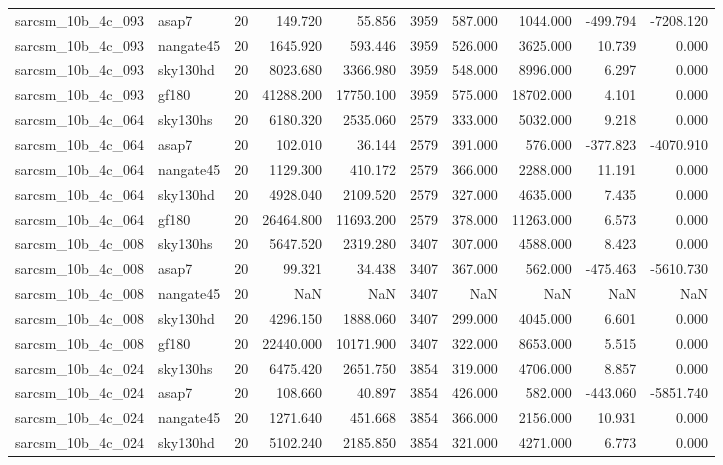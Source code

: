 \documentclass{article}
\begin{document}
\begin{longtable}{llrrrrrrrr}
sarcsm\_10b\_4c\_093 & asap7 & 20 & 149.720 & 55.856 & 3959 & 587.000 & 1044.000 & -499.794 & -7208.120 \\
sarcsm\_10b\_4c\_093 & nangate45 & 20 & 1645.920 & 593.446 & 3959 & 526.000 & 3625.000 & 10.739 & 0.000 \\
sarcsm\_10b\_4c\_093 & sky130hd & 20 & 8023.680 & 3366.980 & 3959 & 548.000 & 8996.000 & 6.297 & 0.000 \\
sarcsm\_10b\_4c\_093 & gf180 & 20 & 41288.200 & 17750.100 & 3959 & 575.000 & 18702.000 & 4.101 & 0.000 \\
sarcsm\_10b\_4c\_064 & sky130hs & 20 & 6180.320 & 2535.060 & 2579 & 333.000 & 5032.000 & 9.218 & 0.000 \\
sarcsm\_10b\_4c\_064 & asap7 & 20 & 102.010 & 36.144 & 2579 & 391.000 & 576.000 & -377.823 & -4070.910 \\
sarcsm\_10b\_4c\_064 & nangate45 & 20 & 1129.300 & 410.172 & 2579 & 366.000 & 2288.000 & 11.191 & 0.000 \\
sarcsm\_10b\_4c\_064 & sky130hd & 20 & 4928.040 & 2109.520 & 2579 & 327.000 & 4635.000 & 7.435 & 0.000 \\
sarcsm\_10b\_4c\_064 & gf180 & 20 & 26464.800 & 11693.200 & 2579 & 378.000 & 11263.000 & 6.573 & 0.000 \\
sarcsm\_10b\_4c\_008 & sky130hs & 20 & 5647.520 & 2319.280 & 3407 & 307.000 & 4588.000 & 8.423 & 0.000 \\
sarcsm\_10b\_4c\_008 & asap7 & 20 & 99.321 & 34.438 & 3407 & 367.000 & 562.000 & -475.463 & -5610.730 \\
sarcsm\_10b\_4c\_008 & nangate45 & 20 & NaN & NaN & 3407 & NaN & NaN & NaN & NaN \\
sarcsm\_10b\_4c\_008 & sky130hd & 20 & 4296.150 & 1888.060 & 3407 & 299.000 & 4045.000 & 6.601 & 0.000 \\
sarcsm\_10b\_4c\_008 & gf180 & 20 & 22440.000 & 10171.900 & 3407 & 322.000 & 8653.000 & 5.515 & 0.000 \\
sarcsm\_10b\_4c\_024 & sky130hs & 20 & 6475.420 & 2651.750 & 3854 & 319.000 & 4706.000 & 8.857 & 0.000 \\
sarcsm\_10b\_4c\_024 & asap7 & 20 & 108.660 & 40.897 & 3854 & 426.000 & 582.000 & -443.060 & -5851.740 \\
sarcsm\_10b\_4c\_024 & nangate45 & 20 & 1271.640 & 451.668 & 3854 & 366.000 & 2156.000 & 10.931 & 0.000 \\
sarcsm\_10b\_4c\_024 & sky130hd & 20 & 5102.240 & 2185.850 & 3854 & 321.000 & 4271.000 & 6.773 & 0.000 \\

\end{longtable}
\end{document}
